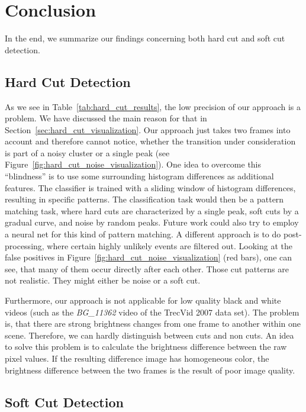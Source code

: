 \section{Conclusion}
\label{sec:conclusion}
In the end, we summarize our findings concerning both hard cut and soft cut detection.

\subsection{Hard Cut Detection}
\label{sec:conclusion_hard_cut}

As we see in Table~\ref{tab:hard_cut_results}, the low precision of our approach is a problem.
We have discussed the main reason for that in Section~\ref{sec:hard_cut_visualization}.
Our approach just takes two frames into account and therefore cannot notice, whether the transition under consideration is part of a noisy cluster or a single peak (see Figure~\ref{fig:hard_cut_noise_visualization}).
One idea to overcome this ``blindness'' is to use some surrounding histogram differences as additional features.
The classifier is trained with a sliding window of histogram differences, resulting in specific patterns.
The classification task would then be a pattern matching task, where hard cuts are characterized by a single peak, soft cuts by a gradual curve, and noise by random peaks.
Future work could also try to employ a neural net for this kind of pattern matching.
A different approach is to do post-processing, where certain highly unlikely events are filtered out.
Looking at the false positives in Figure~\ref{fig:hard_cut_noise_visualization} (red bars), one can see, that many of them occur directly after each other.
Those cut patterns are not realistic.
They might either be noise or a soft cut.

Furthermore, our approach is not applicable for low quality black and white videos (such as the \emph{BG\_11362} video of the TrecVid 2007 data set).
The problem is, that there are strong brightness changes from one frame to another within one scene.
Therefore, we can hardly distinguish between cuts and non cuts.
An idea to solve this problem is to calculate the brightness difference between the raw pixel values.
If the resulting difference image has homogeneous color, the brightness difference between the two frames is the result of poor image quality.

\subsection{Soft Cut Detection}
\label{sec:conclusion_hard_cut}


